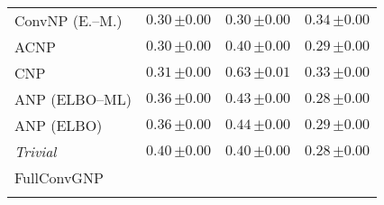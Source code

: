 \begin{tabular}[t]{lccc}
ConvNP (E.--M.) & $0.30\,{ \scriptstyle \pm  0.00 }$ & $0.30\,{ \scriptstyle \pm  0.00 }$ & $0.34\,{ \scriptstyle \pm  0.00 }$ \\ 
ACNP & $0.30\,{ \scriptstyle \pm  0.00 }$ & $0.40\,{ \scriptstyle \pm  0.00 }$ & $0.29\,{ \scriptstyle \pm  0.00 }$ \\ 
CNP & $0.31\,{ \scriptstyle \pm  0.00 }$ & $0.63\,{ \scriptstyle \pm  0.01 }$ & $0.33\,{ \scriptstyle \pm  0.00 }$ \\ 
ANP (ELBO--ML) & $0.36\,{ \scriptstyle \pm  0.00 }$ & $0.43\,{ \scriptstyle \pm  0.00 }$ & $0.28\,{ \scriptstyle \pm  0.00 }$ \\ 
ANP (ELBO) & $0.36\,{ \scriptstyle \pm  0.00 }$ & $0.44\,{ \scriptstyle \pm  0.00 }$ & $0.29\,{ \scriptstyle \pm  0.00 }$ \\ 
{\normalshape \textit{Trivial}} & $0.40\,{ \scriptstyle \pm  0.00 }$ & $0.40\,{ \scriptstyle \pm  0.00 }$ & $0.28\,{ \scriptstyle \pm  0.00 }$ \\ 
FullConvGNP &  &  &  \\ 
\bottomrule \\ 
\end{tabular} 
